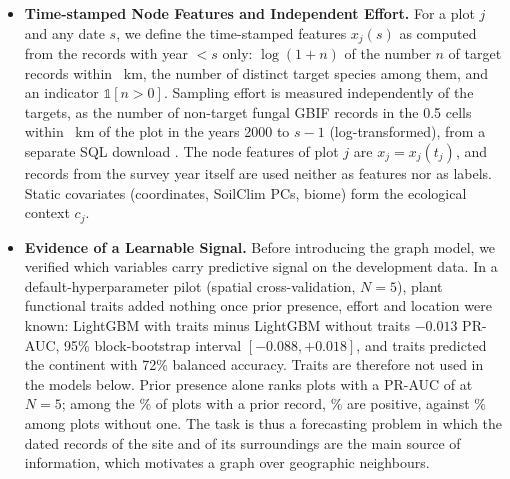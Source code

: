 \documentclass[a4paper,fleqn]{cas-sc}
\begin{document}
\begin{itemize}[leftmargin=1.4em]
\item \textbf{Time-stamped Node Features and Independent Effort.} For a plot $j$ and any date $s$, we define the time-stamped features $x_j(s)$ as computed from the records with year $< s$ only: $\log(1+n)$ of the number $n$ of target records within \bufferKm~km, the number of distinct target species among them, and an indicator $\mathbb{1}[n > 0]$. Sampling effort is measured independently of the targets, as the number of non-target fungal GBIF records in the 0.5\textdegree{} cells within \bufferKm~km of the plot in the years 2000 to $s-1$ (log-transformed), from a separate SQL download \citep{gbifeffort}. The node features of plot $j$ are $x_j = x_j(t_j)$, and records from the survey year itself are used neither as features nor as labels. Static covariates (coordinates, SoilClim PCs, biome) form the ecological context $c_j$.

\item \textbf{Evidence of a Learnable Signal.} Before introducing the graph model, we verified which variables carry predictive signal on the development data. In a default-hyperparameter pilot (spatial cross-validation, $N=5$), plant functional traits added nothing once prior presence, effort and location were known: LightGBM with traits minus LightGBM without traits $-0.013$ PR-AUC, 95\% block-bootstrap interval $[-0.088, +0.018]$, and traits predicted the continent with 72\% balanced accuracy. Traits are therefore not used in the models below. Prior presence alone ranks plots with a PR-AUC of \priorCountPRNfive{} at $N=5$; among the \pctPrior\% of plots with a prior record, \prevGivenPriorNfive\% are positive, against \prevGivenNoPriorNfive\% among plots without one. The task is thus a forecasting problem in which the dated records of the site and of its surroundings are the main source of information, which motivates a graph over geographic neighbours.


\end{itemize}
\end{document}

